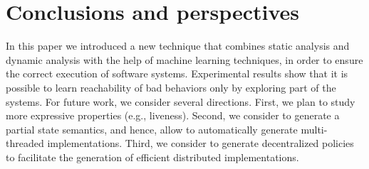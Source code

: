 \section{Conclusions and perspectives}
\label{sec:conclusion}
In this paper we introduced a new technique that combines static analysis and dynamic analysis with the help of machine learning techniques, in order to ensure the correct execution of software systems. 
Experimental results show that it is possible to learn reachability of bad behaviors only by exploring part of the systems. For future work, we consider several directions. 
First, we plan to study more expressive properties (e.g., liveness). Second, we consider to generate a partial state semantics, and hence, allow to automatically generate multi-threaded implementations. Third, we consider to generate decentralized policies to facilitate the generation of efficient distributed implementations. 